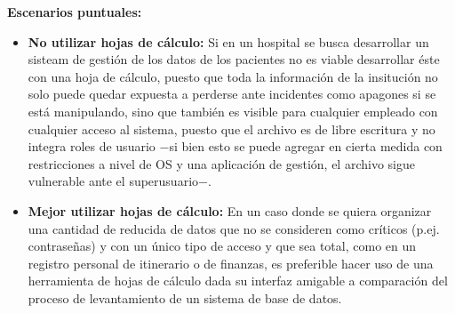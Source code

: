 \textbf{Escenarios puntuales:}
\begin{itemize}
    \item \textbf{No utilizar hojas de cálculo:} Si en un hospital se busca desarrollar un sisteam de gestión de los datos de los pacientes no es viable desarrollar éste con una hoja de cálculo, puesto que toda la información de la insitución no solo puede quedar expuesta a perderse ante incidentes como apagones si se está manipulando, sino que también es visible para cualquier empleado con cualquier acceso al sistema, puesto que el archivo es de libre escritura y no integra roles de usuario $-$si bien esto se puede agregar en cierta medida con restricciones a nivel de OS y una aplicación de gestión, el archivo sigue vulnerable ante el superusuario$-$.
    \item \textbf{Mejor utilizar hojas de cálculo:} En un caso donde se quiera organizar una cantidad de reducida de datos que no se consideren como críticos (p.ej. contraseñas) y con un único tipo de acceso y que sea total, como en un registro personal de itinerario o de finanzas, es preferible hacer uso de una herramienta de hojas de cálculo dada su interfaz amigable a comparación del proceso de levantamiento de un sistema de base de datos.
\end{itemize}
